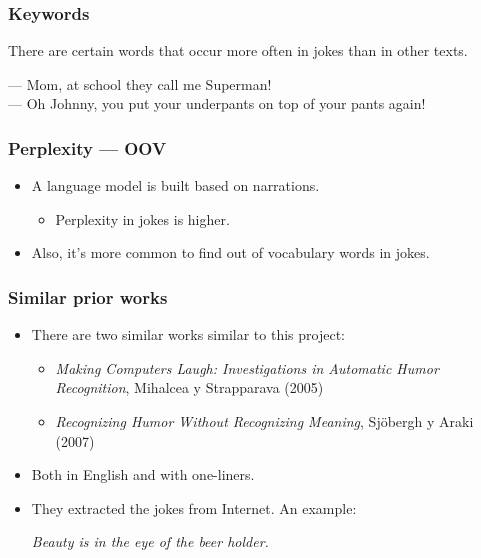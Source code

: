 \begin{frame}
    \frametitle{Keywords}

    There are certain words that occur more often in jokes than in other texts.

    \begin{example}
        --- Mom, at school they call me Superman! \\
        --- Oh Johnny, you put your underpants on top of your pants again!
    \end{example}
\end{frame}

\begin{frame}
    \frametitle{Perplexity --- OOV}

    \begin{itemize}
        \item A language model is built based on narrations.

        \begin{itemize}
            \item Perplexity in jokes is higher.
        \end{itemize}

        \item Also, it's more common to find out of vocabulary words in jokes.
    \end{itemize}
\end{frame}

\begin{frame}
    \frametitle{Similar prior works}

    \begin{itemize}
        \item There are two similar works similar to this project:

        \begin{itemize}
            \item \emph{Making Computers Laugh: Investigations in Automatic Humor Recognition}, Mihalcea y Strapparava (2005)
            \item \emph{Recognizing Humor Without Recognizing Meaning}, Sjöbergh y Araki (2007)
        \end{itemize}

        \item Both in English and with one-liners.

        \item They extracted the jokes from Internet. An example:

        \begin{center}
            \emph{Beauty is in the eye of the beer holder.}
        \end{center}
    \end{itemize}
\end{frame}

